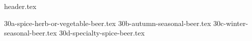 \clearpage
{}
\divisorLine

{header.tex}

\begin{multicols}{2}

{30a-spice-herb-or-vegetable-beer.tex}
{30b-autumn-seasonal-beer.tex}
{30c-winter-seasonal-beer.tex}
{30d-specialty-spice-beer.tex}

\end{multicols}